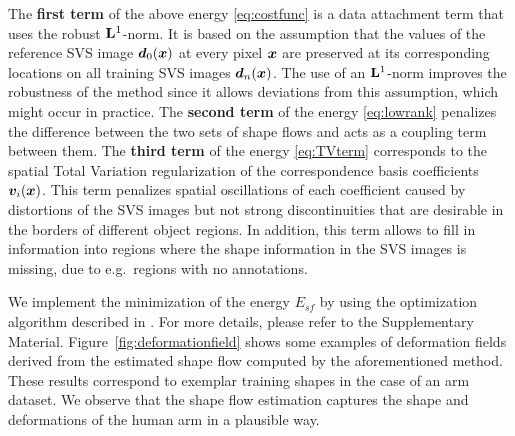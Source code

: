 The \textbf{first term} of the above energy \eqref{eq:costfunc} is a data attachment term
that uses the robust $\mathbf{L}^1$-norm.  It is based on the assumption that the values of the reference SVS image $\bm{d}_0(\boldsymbol{x})$ at every pixel $\boldsymbol{x}$ are preserved at its corresponding locations on all training SVS images $\bm{d}_n(\boldsymbol{x})$. The use of an $\mathbf{L}^1$-norm improves the robustness of the method since it allows deviations from this assumption, which might occur in practice.
The \textbf{second term} of the energy \eqref{eq:lowrank} penalizes the difference between the two sets  of shape flows and acts as a coupling term between them.
The \textbf{third term} of the energy \eqref{eq:TVterm} corresponds to the spatial Total Variation regularization \cite{rudin92} of
the correspondence basis coefficients $\bm{v}_i(\boldsymbol{x})$.
This term penalizes spatial oscillations of each coefficient caused by distortions of the SVS images but not strong discontinuities that are desirable in the borders of different object regions. In addition, this term allows to fill in information into regions where the shape information in the SVS images is missing, due to e.g.~regions with no annotations.

We implement the minimization of the energy $E_{sf}$ by using the optimization algorithm described in \cite{Garg:2013hu}. For more details, please refer to the Supplementary Material.
%
Figure~\ref{fig:deformationfield} shows some examples of deformation fields derived from the estimated shape flow computed by the aforementioned method. These results correspond to exemplar training shapes in the case of an arm dataset. We observe that the shape flow estimation captures the shape and deformations of the human arm in a plausible way.

